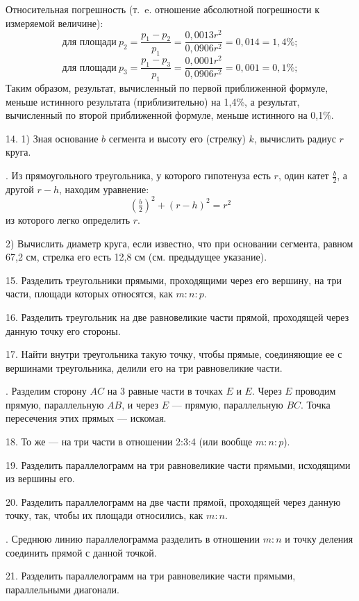 \documentclass[oneside]{book}
\begin{document}
Относительная погрешность (т.~e. отношение абсолютной погрешности к измеряемой величине):
\[\text{для площади}~p_2 = \frac{p_1-p_2}{p_1}=\frac{0,0013r^2}{0{,}0906r^2}=0{,}014 = 1{,}4\%;\]
\[\text{для площади}~p_3 = \frac{p_1-p_3}{p_1}=\frac{0,0001r^2}{0{,}0906r^2}=0{,}001 = 0{,}1\%;\]
Таким образом, результат, вычисленный по первой приближенной формуле, меньше истинного результата (приблизительно) на 1,4\%, а результат, вычисленный по второй приближенной формуле, меньше истинного на 0,1\%.

14.
1) Зная основание $b$ сегмента и высоту его (стрелку) $k$, вычислить радиус $r$ круга.

.
Из прямоугольного треугольника, у которого гипотенуза есть $r$, один катет $\frac b2$, а другой $r-h$, находим уравнение:
\[(\tfrac b2)^2+(r-h)^2=r^2\]
из которого легко определить $r$.

2) Вычислить диаметр круга, если известно, что при основании сегмента, равном 67,2 см, стрелка его есть 12,8 см (см. предыдущее указание).


15.
Разделить треугольники прямыми, проходящими через его вершину, на три части, площади которых относятся, как $m:n:p$.

16.
Разделить треугольник на две равновеликие части прямой, проходящей через данную точку его стороны.

17.
Найти внутри треугольника такую точку, чтобы прямые, соединяющие ее с вершинами треугольника, делили его на три равновеликие части.

.
Разделим сторону $AC$ на 3 равные части в точках $E$ и $E$.
Через $E$ проводим прямую, параллельную $AB$, и через $E$ — прямую, параллельную $BC$.
Точка пересечения этих прямых — искомая.

18.
То же — на три части в отношении 2:3:4 (или вообще $m:n:p$).

19.
Разделить параллелограмм на три равновеликие части прямыми, исходящими из вершины его.

20.
Разделить параллелограмм на две части прямой, проходящей через данную точку, так, чтобы их площади относились, как $m:n$.

.
Среднюю линию параллелограмма разделить в отношении $m:n$ и точку деления соединить прямой с данной точкой. %

21.
Разделить параллелограмм на три равновеликие части прямыми, параллельными диагонали.
\end{document}
